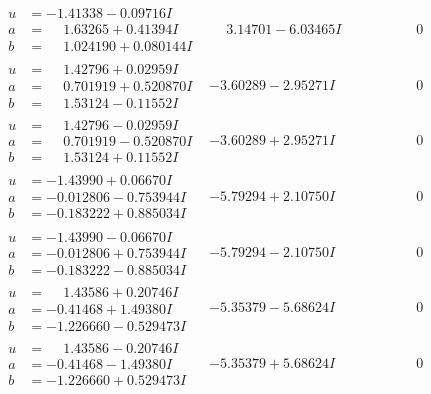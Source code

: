 \documentclass[1p]{elsarticle_modified}
\theoremstyle{definition}
\begin{document}
$$\begin{array}{c|c|c}
\begin{aligned}
u &= -1.41338 - 0.09716 I \\
a &= \phantom{-}1.63265 + 0.41394 I \\
b &= \phantom{-}1.024190 + 0.080144 I\end{aligned}
 & \phantom{-}3.14701 - 6.03465 I & \phantom{-0.000000 } 0 \\ \hline\begin{aligned}
u &= \phantom{-}1.42796 + 0.02959 I \\
a &= \phantom{-}0.701919 + 0.520870 I \\
b &= \phantom{-}1.53124 - 0.11552 I\end{aligned}
 & -3.60289 - 2.95271 I & \phantom{-0.000000 } 0 \\ \hline\begin{aligned}
u &= \phantom{-}1.42796 - 0.02959 I \\
a &= \phantom{-}0.701919 - 0.520870 I \\
b &= \phantom{-}1.53124 + 0.11552 I\end{aligned}
 & -3.60289 + 2.95271 I & \phantom{-0.000000 } 0 \\ \hline\begin{aligned}
u &= -1.43990 + 0.06670 I \\
a &= -0.012806 - 0.753944 I \\
b &= -0.183222 + 0.885034 I\end{aligned}
 & -5.79294 + 2.10750 I & \phantom{-0.000000 } 0 \\ \hline\begin{aligned}
u &= -1.43990 - 0.06670 I \\
a &= -0.012806 + 0.753944 I \\
b &= -0.183222 - 0.885034 I\end{aligned}
 & -5.79294 - 2.10750 I & \phantom{-0.000000 } 0 \\ \hline\begin{aligned}
u &= \phantom{-}1.43586 + 0.20746 I \\
a &= -0.41468 + 1.49380 I \\
b &= -1.226660 - 0.529473 I\end{aligned}
 & -5.35379 - 5.68624 I & \phantom{-0.000000 } 0 \\ \hline\begin{aligned}
u &= \phantom{-}1.43586 - 0.20746 I \\
a &= -0.41468 - 1.49380 I \\
b &= -1.226660 + 0.529473 I\end{aligned}
 & -5.35379 + 5.68624 I & \phantom{-0.000000 } 0\\

\end{array}$$
\end{document}
